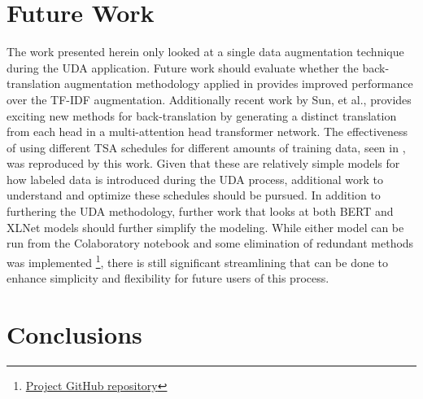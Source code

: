 \documentclass[twoside,twocolumn,10pt]{article}
\begin{document}
\section{Future Work} \label{future}
The work presented herein only looked at a single data augmentation technique during the UDA application. Future work should evaluate whether the back-translation augmentation methodology applied in \cite{Xie:2019} provides improved performance over the TF-IDF augmentation. Additionally recent work by Sun, et al., \cite{Sun:2019} provides exciting new methods for back-translation by generating a distinct translation from each head in a multi-attention head transformer network. The effectiveness of using different TSA schedules for different amounts of training data, seen in \cite{Xie:2019}, was reproduced by this work. Given that these are relatively simple models for how labeled data is introduced during the UDA process, additional work to understand and optimize these schedules should be pursued. In addition to furthering the UDA methodology, further work that looks at both BERT and XLNet models should further simplify the modeling. While either model can be run from the Colaboratory notebook and some elimination of redundant methods was implemented \footnote{ \href{https://github.com/tomgoter/nlp_finalproject}{Project GitHub repository}}, there is still significant streamlining that can be done to enhance simplicity and flexibility for future users of this process.


\section{Conclusions} \label{conclusions}




\end{document}
